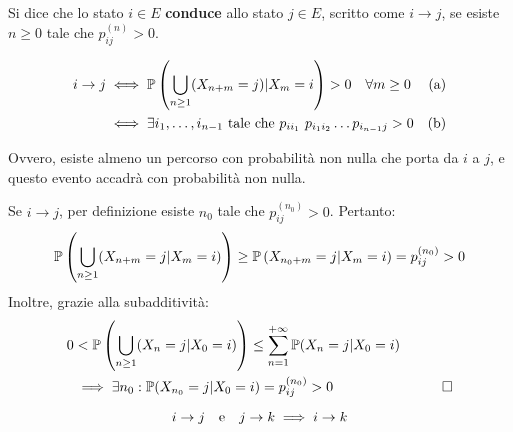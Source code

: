\begin{defn}\label{def-condvx}
	Si dice che lo stato $i \in E$ \textbf{conduce} allo stato $j \in E$, scritto come $i \to j$, se esiste $n \ge 0$ tale che $p_{ij}^{(n)} > 0$.
\end{defn}

\begin{prop}\label{prop-iff-mark}
	\begin{align*}
		i \to j & \iff \mathbb P\left(\bigcup_{n \ge 1}(X_{n+m}=j) | X_m=i\right) > 0 \quad \forall m \ge 0 &\text{(a)} \\
		& \iff \exists i_1,\dots,i_{n-1} \text{ tale che } p_{i i_1} \ p_{i_1 i_2} \dots p_{i_{n-1} j} > 0 &\text{(b)}
	\end{align*}
\end{prop}
Ovvero, esiste almeno un percorso con probabilità non nulla che porta da $i$ a $j$, e questo evento accadrà con probabilità non nulla.
\begin{dimo}
	Se $i \to j$, per definizione esiste $n_0$ tale che $p_{ij}^{(n_0)} > 0$. Pertanto:
	$$\mathbb P\left(\bigcup_{n \ge 1}(X_{n+m}=j | X_m=i) \right) \ge \mathbb P\left(X_{n_0+m}=j | X_m=i\right) = p_{ij}^{(n_0)} > 0$$
	Inoltre, grazie alla subadditività:
	\begin{align*}
		0 &< \mathbb P\left(\bigcup_{n \ge 1}(X_n=j | X_0=i)\right) \le \sum_{n=1}^{+\infty} \mathbb P(X_n=j | X_0=i) \\
	 		&\implies \exists n_0 : \mathbb P(X_{n_0}=j | X_0=i) = p_{ij}^{(n_0)} > 0 &\qedhere
 \end{align*}
\end{dimo}
\begin{coro}[transitività]\label{coro-catena-conduc}
	$$i \to j \quad \text e \quad j \to k \implies i \to k$$
\end{coro}

